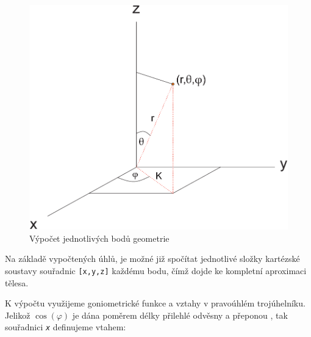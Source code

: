 \begin{figure}[h]
	\label{img:2}
	\centering
	\includegraphics[scale=1.0,angle=0,width=0.8\linewidth]{obrazky-figures/geometry}
	\caption{Výpočet jednotlivých bodů geometrie}
	\label{fig:geom}
\end{figure}
 
Na základě vypočtených úhlů, je možné již spočítat jednotlivé složky kartézské soustavy souřadnic \texttt{[x,y,z]} každému bodu, čímž dojde ke kompletní aproximaci tělesa.

\newpage

K výpočtu využijeme goniometrické funkce  a vztahy v pravoúhlém trojúhelníku. Jelikož $ \cos (\varphi) $ je dána poměrem délky přilehlé odvěsny a přeponou \cite{Goniometrie}, tak souřadnici \texttt{\textit{x}} definujeme vtahem:
 
